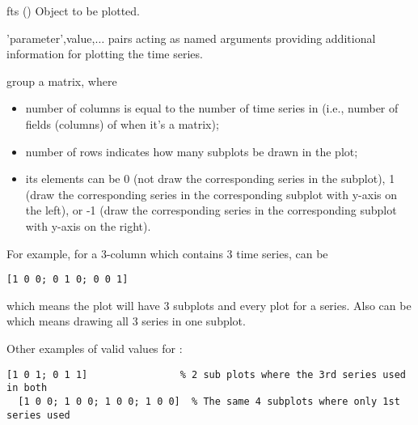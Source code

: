\inarg
\begin{argdesc}
\item[fts] (\myfints{}) Object to be plotted. 
\item ['parameter',value,$\ldots$] pairs acting as named arguments providing additional information for plotting the time series. 
      \begin{argdesc}
      \item[group] a matrix, where 
         \begin{itemize}
           \item number of columns is equal to the number of time series in 
                 (i.e., number of fields (columns) of  when it's a matrix);
           \item number of rows indicates how many subplots be drawn in the plot;
           \item its elements can be 0 (not draw the corresponding series in the subplot),
                 1 (draw the corresponding series in the corresponding subplot with y-axis on the left),
				 or -1 (draw the corresponding series in the corresponding subplot with y-axis on the right).
         \end{itemize}
       For example, for a 3-column  which contains 3 time series,
        can be 
  \begin{lstlisting}[numbers=none]
  [1 0 0; 0 1 0; 0 0 1]
  \end{lstlisting}
       which means the plot will have 3 subplots and every plot for a series. 
       Also  can be \mcode{[1 1 1]} which means drawing all 3 series in one subplot. \par
       Other examples of valid values for :
  \begin{lstlisting}[numbers=none]
  [1 0 1; 0 1 1]                % 2 sub plots where the 3rd series used in both 
  [1 0 0; 1 0 0; 1 0 0; 1 0 0]  % The same 4 subplots where only 1st series used


\end{lstlisting}
\end{argdesc}
\end{argdesc}
